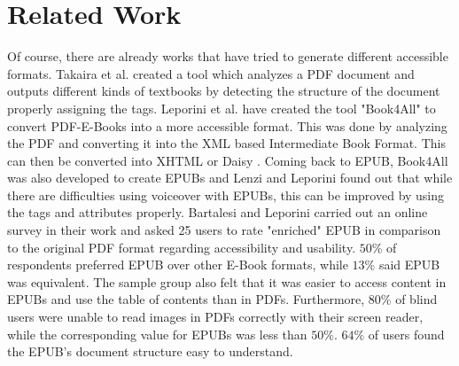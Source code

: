 \documentclass[runningheads,a4paper]{llncs}
\begin{document}
\section{Related Work}
Of course, there are already works that have tried to generate different accessible formats. Takaira et al. \cite{unified} created a tool which analyzes a PDF document and outputs different kinds of textbooks by detecting the structure of the document properly assigning the tags.
Leporini et al. \cite{book4all} have created the tool "Book4All" to convert PDF-E-Books into a more accessible format. This was done by analyzing the PDF and converting it into the XML based Intermediate Book Format. This can then be converted into XHTML or Daisy \cite{daisyAccessibility}. 
Coming back to EPUB, Book4All was also developed to create EPUBs and Lenzi and Leporini \cite{voiceover} found out that while there are difficulties using voiceover with EPUBs, this can be improved by using the tags and attributes properly. 
Bartalesi and Leporini \cite{enrichEPUB} carried out an online survey in their work and asked 25 users to rate "enriched" EPUB in comparison to the original PDF format regarding accessibility and usability. $50\%$ of respondents preferred EPUB over other E-Book formats, while $13\%$ said EPUB was equivalent.
The sample group also felt that it was easier to access content in EPUBs and use the table of contents than in PDFs.
Furthermore, $80\%$ of blind users were unable to read images in PDFs correctly with their screen reader, while the corresponding value for EPUBs was less than $50\%$. $64\%$ of users found the EPUB's document structure easy to understand. 
\end{document}
